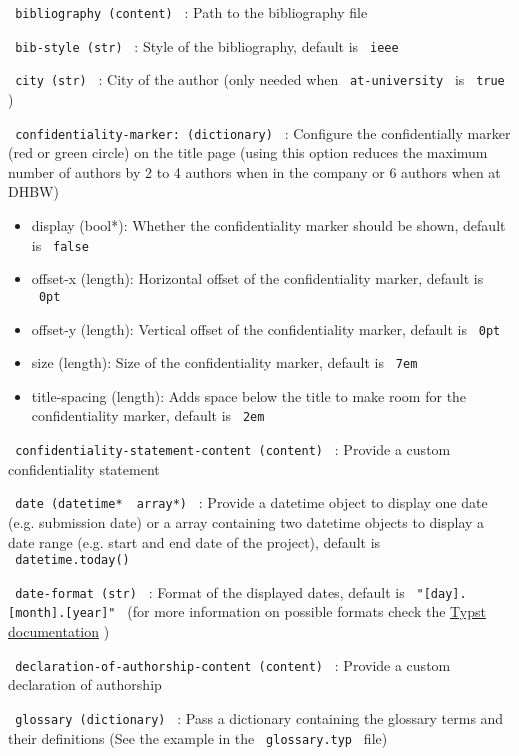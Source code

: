 \texttt{\ bibliography\ (content)\ } : Path to the bibliography file

\texttt{\ bib-style\ (str)\ } : Style of the bibliography, default is
\texttt{\ ieee\ }

\texttt{\ city\ (str)\ } : City of the author (only needed when
\texttt{\ at-university\ } is \texttt{\ true\ } )

\texttt{\ confidentiality-marker:\ (dictionary)\ } : Configure the
confidentially marker (red or green circle) on the title page (using
this option reduces the maximum number of authors by 2 to 4 authors when
in the company or 6 authors when at DHBW)

\begin{itemize}
\tightlist
\item
  display (bool*): Whether the confidentiality marker should be shown,
  default is \texttt{\ false\ }
\item
  offset-x (length): Horizontal offset of the confidentiality marker,
  default is \texttt{\ 0pt\ }
\item
  offset-y (length): Vertical offset of the confidentiality marker,
  default is \texttt{\ 0pt\ }
\item
  size (length): Size of the confidentiality marker, default is
  \texttt{\ 7em\ }
\item
  title-spacing (length): Adds space below the title to make room for
  the confidentiality marker, default is \texttt{\ 2em\ }
\end{itemize}

\texttt{\ confidentiality-statement-content\ (content)\ } : Provide a
custom confidentiality statement

\texttt{\ date\ (datetime*\ \textbar{}\ array*)\ } : Provide a datetime
object to display one date (e.g. submission date) or a array containing
two datetime objects to display a date range (e.g. start and end date of
the project), default is \texttt{\ datetime.today()\ }

\texttt{\ date-format\ (str)\ } : Format of the displayed dates, default
is \texttt{\ "{[}day{]}.{[}month{]}.{[}year{]}"\ } (for more information
on possible formats check the
\href{https://typst.app/docs/reference/foundations/datetime/\#format}{Typst
documentation} )

\texttt{\ declaration-of-authorship-content\ (content)\ } : Provide a
custom declaration of authorship

\texttt{\ glossary\ (dictionary)\ } : Pass a dictionary containing the
glossary terms and their definitions (See the example in the
\texttt{\ glossary.typ\ } file)

